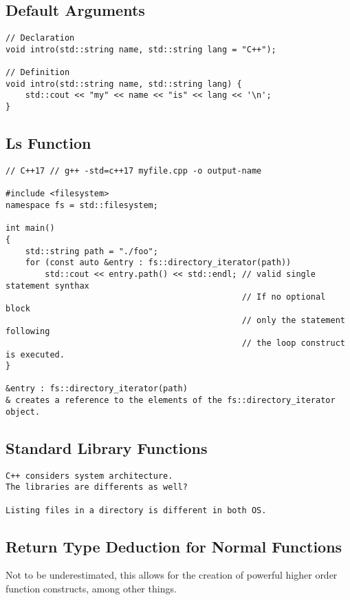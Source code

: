 \documentclass[openany]{report}
\begin{document}
\subsection{Default Arguments}

\begin{verbatim}
// Declaration
void intro(std::string name, std::string lang = "C++");

// Definition
void intro(std::string name, std::string lang) {
    std::cout << "my" << name << "is" << lang << '\n';
}
\end{verbatim}

\subsection{Ls Function}

\begin{verbatim}
// C++17 // g++ -std=c++17 myfile.cpp -o output-name

#include <filesystem>
namespace fs = std::filesystem;

int main()
{
    std::string path = "./foo";
    for (const auto &entry : fs::directory_iterator(path))
        std::cout << entry.path() << std::endl; // valid single statement synthax
                                                // If no optional block
                                                // only the statement following
                                                // the loop construct is executed.
}

&entry : fs::directory_iterator(path)
& creates a reference to the elements of the fs::directory_iterator object.

\end{verbatim}

\subsection{Standard Library Functions}
\begin{verbatim}
C++ considers system architecture. 
The libraries are differents as well?

Listing files in a directory is different in both OS.
\end{verbatim}

\subsection{Return Type Deduction for Normal Functions}

Not to be underestimated, this allows
for the creation of powerful higher order function constructs, among other things.
\end{document}
